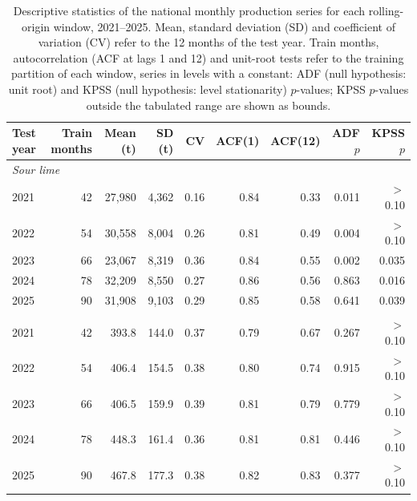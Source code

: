 \begin{table}[htbp]
\centering
\small
\caption{Descriptive statistics of the national monthly production series for each rolling-origin window, 2021--2025. Mean, standard deviation (SD) and coefficient of variation (CV) refer to the 12 months of the test year. Train months, autocorrelation (ACF at lags 1 and 12) and unit-root tests refer to the training partition of each window, series in levels with a constant: ADF (null hypothesis: unit root) and KPSS (null hypothesis: level stationarity) $p$-values; KPSS $p$-values outside the tabulated range are shown as bounds.}
\label{tab:main_descriptive_series}
\begin{tabular}{lrrrrrrrr}
\toprule
Test year & Train months & Mean (t) & SD (t) & CV & ACF(1) & ACF(12) & ADF $p$ & KPSS $p$ \\
\midrule
\multicolumn{9}{l}{\textit{Sour lime}} \\
2021 & 42 & 27,980 & 4,362 & 0.16 & 0.84 & 0.33 & 0.011 & $>$0.10 \\
2022 & 54 & 30,558 & 8,004 & 0.26 & 0.81 & 0.49 & 0.004 & $>$0.10 \\
2023 & 66 & 23,067 & 8,319 & 0.36 & 0.84 & 0.55 & 0.002 & 0.035 \\
2024 & 78 & 32,209 & 8,550 & 0.27 & 0.86 & 0.56 & 0.863 & 0.016 \\
2025 & 90 & 31,908 & 9,103 & 0.29 & 0.85 & 0.58 & 0.641 & 0.039 \\
\addlinespace
\multicolumn{9}{l}{\textit{Sweet lime}} \\
2021 & 42 & 393.8 & 144.0 & 0.37 & 0.79 & 0.67 & 0.267 & $>$0.10 \\
2022 & 54 & 406.4 & 154.5 & 0.38 & 0.80 & 0.74 & 0.915 & $>$0.10 \\
2023 & 66 & 406.5 & 159.9 & 0.39 & 0.81 & 0.79 & 0.779 & $>$0.10 \\
2024 & 78 & 448.3 & 161.4 & 0.36 & 0.81 & 0.81 & 0.446 & $>$0.10 \\
2025 & 90 & 467.8 & 177.3 & 0.38 & 0.82 & 0.83 & 0.377 & $>$0.10 \\
\bottomrule
\end{tabular}
\end{table}

